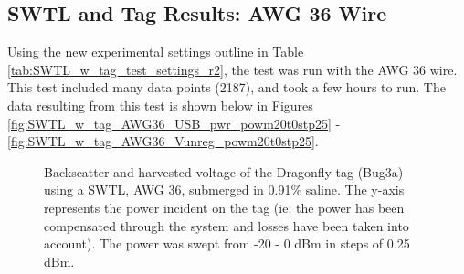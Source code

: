 \documentclass[12pt,onecolumn,titlepage]{article}
\begin{document}
\subsection{SWTL and Tag Results: AWG 36 Wire}
\indent \indent Using the new experimental settings outline in Table \ref{tab:SWTL_w_tag_test_settings_r2}, the test was run with the AWG 36 wire. This test included many data points (2187), and took a few hours to run. The data resulting from this test is shown below in Figures \ref{fig:SWTL_w_tag_AWG36_USB_pwr_powm20t0stp25} - \ref{fig:SWTL_w_tag_AWG36_Vunreg_powm20t0stp25}.



\begin{figure}[htbp]
	\centering
		\quad
		\quad
	\label{fig:SWTL_w_tag_AWG36_powm20t0stp25}
	\caption{Backscatter and harvested voltage of the Dragonfly tag (Bug3a) using a SWTL, AWG 36, submerged in 0.91\% saline. The y-axis represents the power incident on the tag (ie: the power has been compensated through the system and losses have been taken into account). The power was swept from -20 - 0 dBm in steps of 0.25 dBm.}
\end{figure}
\end{document}
